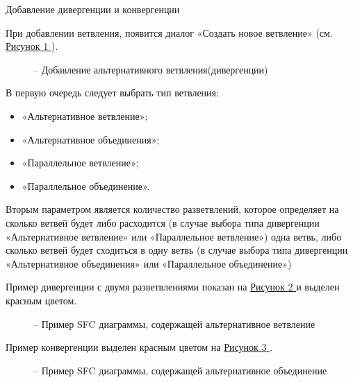 \documentclass[letterpaper,10pt,russian]{sphinxmanual}
\begin{document}
Добавление дивергенции и конвергенции

При добавлении ветвления, появится диалог «Создать новое ветвление» (см.
\hyperref[usage_guide/ide_components:image105]{Рисунок \ref{usage_guide/ide_components:image105} }).
\begin{figure}[htbp]
\centering
\capstart

\noindent{}
\caption{– Добавление альтернативного ветвления(дивергенции)}\label{usage_guide/ide_components:image105}\end{figure}

В первую очередь следует выбрать тип ветвления:
\begin{itemize}
\item {} 
«Альтернативное ветвление»;

\item {} 
«Альтернативное объединения»;

\item {} 
«Параллельное ветвление»;

\item {} 
«Параллельное объединение».

\end{itemize}

Вторым параметром является количество разветвлений, которое определяет
на сколько ветвей будет либо расходится (в случае выбора типа
дивергенции «Альтернативное ветвление» или «Параллельное ветвление»)
одна ветвь, либо сколько ветвей будет сходиться в одну ветвь (в случае
выбора типа дивергенции «Альтернативное объединения» или «Параллельное
объединение»)

Пример дивергенции с двумя разветвлениями показан на \hyperref[usage_guide/ide_components:image106]{Рисунок \ref{usage_guide/ide_components:image106} } и выделен
красным цветом.
\begin{figure}[htbp]
\centering
\capstart

\noindent{}
\caption{– Пример SFC диаграммы, содержащей альтернативное ветвление}\label{usage_guide/ide_components:image106}\end{figure}

Пример конвергенции выделен красным цветом на \hyperref[usage_guide/ide_components:image106-2]{Рисунок \ref{usage_guide/ide_components:image106-2} }.
\begin{figure}[htbp]
\centering
\capstart

\noindent{}
\caption{– Пример SFC диаграммы, содержащей альтернативное объединение}\label{usage_guide/ide_components:image106-2}\end{figure}
\end{document}
